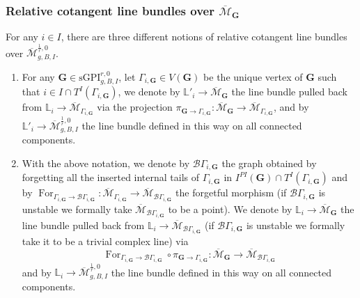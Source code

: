 \documentclass[11pt]{amsart}
\theoremstyle{definition}
\theoremstyle{remark}
\newcommand{\<}{\left<}
\renewcommand{\>}{\right>}
\numberwithin{equation}{section}
\def\Mbar{{\overline{\mathcal M}}}
\def\sGPI{\text{sGPI}}
\begin{document}
\subsubsection{Relative cotangent line bundles over $\Mbar_\mathbf{G}$}\label{sec uni cotangent line over glued moduli}
For any $i\in I$, there are three different notions of relative cotangent line bundles over $\Mbar^{\frac{1}{r},0}_{g,B,I}$.
\begin{enumerate}
    \item 
    For any $\bm{G} \in \sGPI^{r,0}_{g,B,I}$, let $\Gamma_{i,\bm{G}}\in V(\bm{G})$ be the unique vertex of $\bm{G}$ such that %
$i\in I \cap T^I(\Gamma_{i,\bm{G}})$, we denote %
by $\mathbb L'_i\to \Mbar_{\bm{G}}$ the line bundle pulled back from $\mathbb L_i\to \Mbar_{\Gamma_{i,\bm{G}}}$ via the projection %
$\pi_{\bm{G}\to \Gamma_{i,\bm{G}}}\colon \Mbar_{\bm{G}}\to \Mbar_{\Gamma_{i,\bm{G}}}$, and %
by $\mathbb L'_i\to \Mbar^{\frac{1}{r},0}_{g,B,I}$ the line bundle defined in this way on all connected components.
    \item With the above notation, we denote by $\mathcal B \Gamma_{i,\bm{G}}$ the graph obtained by forgetting all the inserted internal tails of $\Gamma_{i,\bm{G}}$ in $I^{PI}(\bm{G})\cap T^I(\Gamma_{i,\bm{G}})$ and by $\operatorname{For}_{\Gamma_{i,\bm{G}}\to \mathcal B\Gamma_{i,\bm{G}}}\colon \Mbar_{\Gamma_{i,\bm{G}}}\to \Mbar_{\mathcal B \Gamma_{i,\bm{G}}}$ the forgetful morphism (if $\mathcal B \Gamma_{i,\bm{G}}$ is unstable we formally take $\Mbar_{\mathcal B \Gamma_{i,\bm{G}}}$ to be a point). We denote by $\mathbb L_i\to \Mbar_{\bm{G}}$ the line bundle pulled back from $\mathbb L_i\to \Mbar_{\mathcal B\Gamma_{i,\bm{G}}}$ (if $\mathcal B \Gamma_{i,\bm{G}}$ is unstable we formally take it to be a trivial complex line) via 
    $$\operatorname{For}_{\Gamma_{i,\bm{G}}\to \mathcal B\Gamma_{i,\bm{G}}}\circ \pi_{\bm{G}\to \Gamma_{i,\bm{G}}} \colon \Mbar_{\bm{G}} \to \Mbar_{\mathcal B\Gamma_{i,\bm{G}}}$$ 
    and by $\mathbb L_i\to \Mbar^{\frac{1}{r},0}_{g,B,I}$ the line bundle defined in this way on all connected components.


\end{enumerate}
\end{document}
